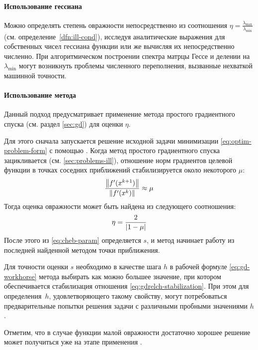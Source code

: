 \paragraph{Использование гессиана}

Можно определять степень овражности непосредственно из соотношения
$\eta=\frac{\lambda_{\max}}{\lambda_{\min}}$ (см.
определение \ref{dfn:ill-cond}), исследуя аналитические выражения для
собственных чисел гессиана функции или же вычисляя их непосредственно
численно. При алгоритмическом построении спектра матрцы Гессе и
делении на $\lambda_{\min}$ могут возникнуть проблемы численного
переполнения, вызванные нехваткой машинной точности.

\paragraph{Использование метода \gd{}}

Данный подход предусматривает применение метода простого градиентного
спуска (см. раздел \ref{sec:gd}) для оценки $\eta$. 

Для этого сначала запускается решение исходной задачи минимизации
\eqref{eq:optim-problem-form} с помощью \gd{}. Когда метод простого
градиентного спуска зацикливается (см. \ref{sec:problems-ill}),
отношение норм градиентов целевой функции в точках соседних
приближений стабилизируется около некоторого $\mu$:
\begin{equation}
  \label{eq:gdrelch-stabilization}
  \frac{\left \lVert{f'(x^{k+1})}\right \rVert}{\left \lVert{f'(x^k)}\right \rVert} \approx \mu
\end{equation}
Тогда оценка овражности может быть найдена из следующего
соотношения:
\begin{equation}
  \label{eq:gdrelch-param}
  \eta = \frac{2}{\left \lvert{1-\mu}\right \rvert}
\end{equation}
После этого из \eqref{eq:cheb-param} определяется $s$, и метод
\relch{} начинает работу из последней найденной методом \gd{} точки
приближения.

Для точности оценки $s$ необходимо в качестве шага $h$ в рабочей
формуле \eqref{eq:gd-workhorse} метода \gd{} выбирать как можно
большее значение, при котором обеспечивается стабилизация отношения
\eqref{eq:gdrelch-stabilization}. При этом для определения $h$,
удовлетворяющего такому свойству, могут потребоваться предварительные
попытки решения задачи с различными пробными значениями $h$.

Отметим, что в случае функции малой овражности достаточно хорошее
решение может получиться уже на этапе применения \gd{}.

